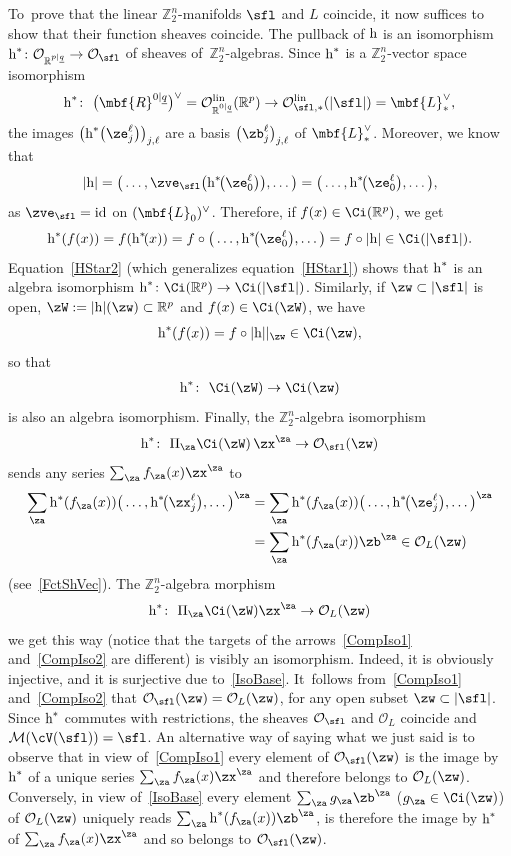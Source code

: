 \documentclass[pdftex]{sigma}%
\newcommand{\rmh}{\textnormal{h}}
\newcommand{\op}[1]{\operatorname{#1}}
\newcommand{\R}{{\mathbb R}}
\newcommand{\Z}{{\mathbb Z}}
\def\ul{\underline}
\def\cM{\cal M}
\def\cO{\mathcal{O}}
\def\cM{\mathcal{M}}
\def\ul{\underline}
\newcommand{\0}{\otimes}
\newcommand{\id}{\op{id}}
\newcommand{\z}{\Z_2^n}
\numberwithin{equation}{section}
\begin{document}
To~prove that the linear $\z$-manifolds $\sfl$ and $L$ coincide, it now suffices to show that their function sheaves coincide. The pullback of $\rmh$ is an isomorphism $\rmh^*\colon \cO_{\R^{p|\ul q}}\to\cO_\sfl$ of sheaves of~$\z$-algebras. Since $\rmh^*$ is a $\z$-vector space isomorphism
\[
\rmh^*\colon\ \big(\mbf{R}^{0|\ul q}\big)^\vee=\cO^{\op{lin}}_{\R^{0|\ul q}}(\R^p)\to \cO^{\op{lin}}_{\sfl,*}(|\sfl|)=\mbf{L}_*^\vee,
\]
the images $\big(\rmh^*\big(\ze_j^\ell\big)\big)_{j,\ell}$ are a basis $\big(\zb_j^\ell\big)_{j,\ell}$ of $\mbf{L}_*^\vee$. Moreover, we know that
\[
|\rmh|=\big(\dots,\zve_\sfl\big(\rmh^*\!\big(\ze_0^\ell\big)\big),\dots\big)=\big(\dots,\rmh^*\!\big(\ze_0^\ell\big),\dots\big),
\]
as $\zve_\sfl=\id$ on $(\mbf{L}_0)^\vee$. Therefore, if $f(x)\in\Ci(\R^p)$, we get
\begin{gather}\label{HStar2}
\rmh^*(f(x))=f(\rmh^*\!(x))=f\circ \big(\dots,\rmh^*\!\big(\ze^\ell_0\big),\dots\big)=f\circ|\rmh|\in\Ci(|\sfl|).
\end{gather}
Equation~\eqref{HStar2} (which generalizes equation~\eqref{HStar1}) shows that $\rmh^*$ is an algebra isomorphism $\rmh^*\colon \Ci(\R^p)\to\Ci(|\sfl|)$. Similarly, if $\zw\subset|\sfl|$ is open, $\zW:=|\rmh|(\zw)\subset\R^p$ and $f(x)\in\Ci(\zW)$, we have
\[
\rmh^*(f(x))=f\circ|\rmh||_{\zw}\in\Ci(\zw),
\]
so that
\begin{gather}\label{IsoBase}
\rmh^*\colon\ \Ci(\zW)\to \Ci(\zw)
\end{gather}
is also an algebra isomorphism. Finally, the $\z$-algebra isomorphism
\begin{gather}\label{CompIso1}
\rmh^*\colon\ \Pi_\za\Ci(\zW)\,\zx^\za\to\cO_\sfl(\zw)
\end{gather}
sends any series $\sum_\za f_\za(x)\zx^\za$ to
\begin{align*}
\sum_\za\rmh^*(f_\za(x))\big(\dots,\rmh^*\!\big(\zx_j^\ell\big),\dots\big)^\za &=\sum_\za\rmh^*(f_\za(x))\big(\dots,\rmh^*\!\big(\ze_j^\ell\big),\dots\big)^\za
\\
&=\sum_\za\rmh^*(f_\za(x))\zb^\za\in\cO_L(\zw)
\end{align*}
(see~\eqref{FctShVec}). The $\z$-algebra morphism
\begin{gather}\label{CompIso2}
\rmh^*\colon\ \Pi_\za\Ci(\zW)\zx^\za\to \cO_L(\zw)
\end{gather}
we get this way (notice that the targets of the arrows~\eqref{CompIso1} and~\eqref{CompIso2} are different) is visibly an isomorphism. Indeed, it is obviously injective, and it is surjective due to~\eqref{IsoBase}. It~follows from~\eqref{CompIso1} and~\eqref{CompIso2} that $\cO_\sfl(\zw)=\cO_L(\zw)$, for any open subset $\zw\subset|\sfl|$. Since $\rmh^*$ commutes with restrictions, the sheaves $\cO_\sfl$ and $\cO_L$ coincide and $\cM(\cV(\sfl))=\sfl$. An alternative way of saying what we just said is to observe that in view of~\eqref{CompIso1} every element of $\cO_\sfl(\zw)$ is the image by $\rmh^*$ of a unique series $\sum_\za f_\za(x)\zx^\za$ and therefore belongs to $\cO_L(\zw)$. Conversely, in view of~\eqref{IsoBase} every element $\sum_\za g_\za \zb^\za$ ($g_\za\in\Ci(\zw)$) of $\cO_{L}(\zw)$ uniquely reads $\sum_\za \rmh^*(f_\za(x))\zb^\za$, is therefore the image by $\rmh^*$ of $\sum_\za f_\za(x)\zx^\za$ and so belongs to $\cO_\sfl(\zw)$.
\end{document}
